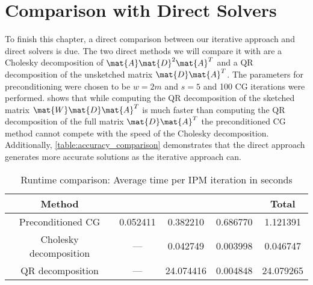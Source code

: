 \section{Comparison with Direct Solvers}

To finish this chapter, a direct comparison between our iterative approach and direct solvers is due.
The two direct methods we will compare it with are a Cholesky decomposition of \(\mat{A}\mat{D}^2\mat{A}^T\) and a QR decomposition of the unsketched matrix \(\mat{D}\mat{A}^T\).
The parameters for preconditioning were chosen to be \(w=2m\) and \(s=5\) and 100 CG iterations were performed.
 shows that while computing the QR decomposition of the sketched matrix \(\mat{W}\mat{D}\mat{A}^T\) is much faster than computing the QR decomposition of the full matrix \(\mat{D}\mat{A}^T\) the preconditioned CG method cannot compete with the speed of the Cholesky decomposition.
Additionally, \cref{table:accuracy_comparison} demonstrates that the direct approach generates more accurate solutions as the iterative approach can.

\begin{table}[htbp]
  \centering
  \begin{tabular}{cSSSS}
    \toprule
    Method & {} & {} & {} & {Total} \\
    \midrule
    Preconditioned CG      & 0.052411 &  0.382210 & 0.686770 &  1.121391 \\
    Cholesky decomposition & {---}      &  0.042749 & 0.003998 &  0.046747 \\
    QR decomposition       & {---}      & 24.074416 & 0.004848 & 24.079265 \\
    \bottomrule
  \end{tabular}
  \caption{Runtime comparison: Average time per IPM iteration in seconds}
  \label{table:runtime_comparison}
\end{table}

